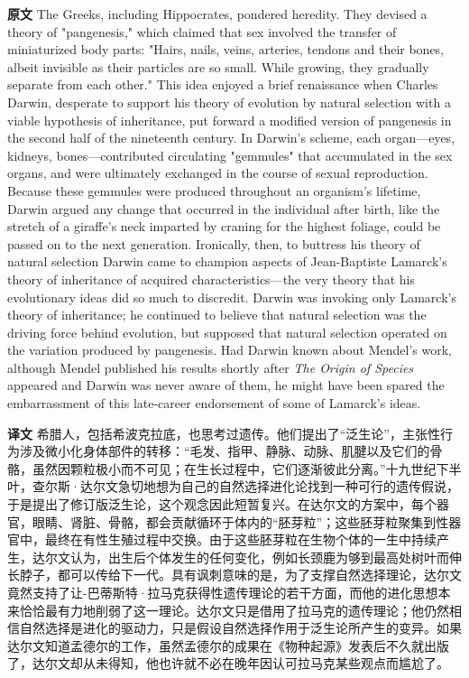 \documentclass[UTF8,zihao=-4]{ctexart}
\newcommand{\BodyFont}{\fontsize{10.5pt}{15.5pt}\selectfont}
\renewenvironment{quote}{\par\noindent\begingroup\BodyFont}{\par\endgroup}
\begin{document}
\begin{quote}
\noindent\textbf{原文} The Greeks, including Hippocrates, pondered heredity. They devised a theory of "pangenesis," which claimed that sex involved the transfer of miniaturized body parts: "Hairs, nails, veins, arteries, tendons and their bones, albeit invisible as their particles are so small. While growing, they gradually separate from each other." This idea enjoyed a brief renaissance when Charles Darwin, desperate to support his theory of evolution by natural selection with a viable hypothesis of inheritance, put forward a modified version of pangenesis in the second half of the nineteenth century. In Darwin's scheme, each organ---eyes, kidneys, bones---contributed circulating "gemmules" that accumulated in the sex organs, and were ultimately exchanged in the course of sexual reproduction. Because these gemmules were produced throughout an organism's lifetime, Darwin argued any change that occurred in the individual after birth, like the stretch of a giraffe's neck imparted by craning for the highest foliage, could be passed on to the next generation. Ironically, then, to buttress his theory of natural selection Darwin came to champion aspects of Jean-Baptiste Lamarck's theory of inheritance of acquired characteristics---the very theory that his evolutionary ideas did so much to discredit. Darwin was invoking only Lamarck's theory of inheritance; he continued to believe that natural selection was the driving force behind evolution, but supposed that natural selection operated on the variation produced by pangenesis. Had Darwin known about Mendel's work, although Mendel published his results shortly after \emph{The Origin of Species} appeared and Darwin was never aware of them, he might have been spared the embarrassment of this late-career endorsement of some of Lamarck's ideas.

\smallskip
\noindent\textbf{译文} 希腊人，包括希波克拉底，也思考过遗传。他们提出了“泛生论”，主张性行为涉及微小化身体部件的转移：“毛发、指甲、静脉、动脉、肌腱以及它们的骨骼，虽然因颗粒极小而不可见；在生长过程中，它们逐渐彼此分离。”十九世纪下半叶，查尔斯·达尔文急切地想为自己的自然选择进化论找到一种可行的遗传假说，于是提出了修订版泛生论，这个观念因此短暂复兴。在达尔文的方案中，每个器官，眼睛、肾脏、骨骼，都会贡献循环于体内的“胚芽粒”；这些胚芽粒聚集到性器官中，最终在有性生殖过程中交换。由于这些胚芽粒在生物个体的一生中持续产生，达尔文认为，出生后个体发生的任何变化，例如长颈鹿为够到最高处树叶而伸长脖子，都可以传给下一代。具有讽刺意味的是，为了支撑自然选择理论，达尔文竟然支持了让-巴蒂斯特·拉马克获得性遗传理论的若干方面，而他的进化思想本来恰恰最有力地削弱了这一理论。达尔文只是借用了拉马克的遗传理论；他仍然相信自然选择是进化的驱动力，只是假设自然选择作用于泛生论所产生的变异。如果达尔文知道孟德尔的工作，虽然孟德尔的成果在《物种起源》发表后不久就出版了，达尔文却从未得知，他也许就不必在晚年因认可拉马克某些观点而尴尬了。
\end{quote}
\end{document}
